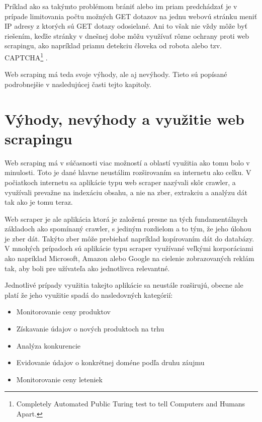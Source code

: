 Príklad ako sa takýmto problémom brániť alebo im priam predchádzať je v prípade limitovania počtu možných GET dotazov na jednu webovú stránku meniť IP adresy z ktorých sú GET dotazy odosielané. Ani to však nie vždy môže byť riešením, keďže stránky v dnešnej dobe môžu využívať rôzne ochrany proti web scrapingu, ako napríklad priamu detekciu človeka od robota alebo tzv. CAPTCHA\footnote{Completely Automated Public Turing test to tell Computers and Humans Apart.} .\cite{JanCurna:online} 

Web scraping má teda svoje výhody, ale aj nevýhody. Tieto sú popísané podrobnejšie v nasledujúcej časti tejto kapitoly.

\section{Výhody, nevýhody a využitie web scrapingu}

Web scraping má v súčasnosti viac možností a oblastí využitia ako tomu bolo v minulosti. Toto je dané hlavne neustálim rozširovaním sa internetu ako celku. V počiatkoch internetu sa aplikácie typu web scraper nazývali skôr crawler, a využívali prevažne na indexáciu obsahu, a nie na zber, extrakciu a analýzu dát tak ako je tomu teraz. 

Web scraper je ale aplikácia ktorá je založená presne na tých fundamentálnych základoch ako spomínaný crawler, s jediným rozdielom a to tým, že jeho úlohou je zber dát. Takýto zber môže prebiehať napríklad kopírovaním dát do databázy. V mnohých prípadoch sú aplikácie typu scraper využívané veľkými korporáciami ako napríklad Microsoft, Amazon alebo Google na cielenie zobrazovaných reklám tak, aby boli pre užívateľa ako jednotlivca relevantné.\cite{online:how_does_scraping_work}

\bigskip

Jednotlivé prípady využitia takejto aplikácie sa neustále rozširujú, obecne ale platí že jeho využitie spadá do nasledovných kategórií:

\begin{itemize}
    \item {Monitorovanie ceny produktov}
    \item {Získavanie údajov o nových produktoch na trhu}
    \item {Analýza konkurencie}
    \item {Evidovanie údajov o konkrétnej doméne podľa druhu záujmu}
    \item {Monitorovanie ceny leteniek}
\end{itemize}

